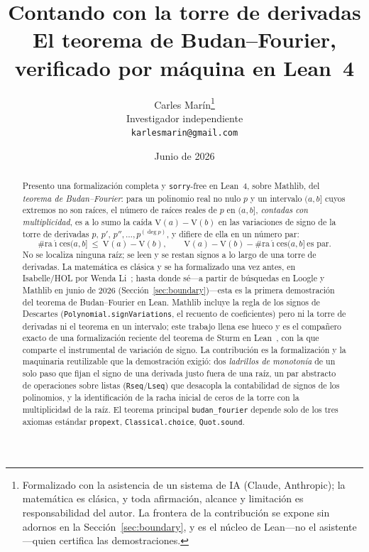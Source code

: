\documentclass[11pt]{article}
\title{\bf Contando con la torre de derivadas\\[4pt]
  \large\normalfont El teorema de Budan--Fourier, verificado por m\'aquina en Lean~4}
\author{Carles Mar\'in\thanks{Formalizado con la asistencia de un sistema de IA (Claude,
Anthropic); la matem\'atica es cl\'asica, y toda afirmaci\'on, alcance y limitaci\'on es
responsabilidad del autor. La frontera de la contribuci\'on se expone sin adornos en la
Secci\'on~\ref{sec:boundary}, y es el n\'ucleo de Lean---no el asistente---quien certifica las
demostraciones.}\\[3pt]
  \normalsize Investigador independiente\\
  \normalsize \texttt{karlesmarin@gmail.com}}
\date{Junio de 2026}
\newcommand{\lean}[1]{\texttt{#1}}
\newcommand{\V}{\mathrm{V}}
\begin{document}
\maketitle

\begin{abstract}
Presento una formalizaci\'on completa y \lean{sorry}-free en Lean~4, sobre Mathlib, del
\emph{teorema de Budan--Fourier}: para un polinomio real no nulo $p$ y un intervalo $(a,b]$ cuyos
extremos no son ra\'ices, el n\'umero de ra\'ices reales de $p$ en $(a,b]$, \emph{contadas con
multiplicidad}, es a lo sumo la ca\'ida $\V(a)-\V(b)$ en las variaciones de signo de la torre de
derivadas $p,\,p',\,p'',\dots,p^{(\deg p)}$, y difiere de ella en un n\'umero par:
\[
  \#\mathrm{ra\acute{\imath}ces}(a,b]\ \le\ \V(a)-\V(b),\qquad
  \V(a)-\V(b)-\#\mathrm{ra\acute{\imath}ces}(a,b]\ \text{es par.}
\]
No se localiza ninguna ra\'iz; se leen y se restan signos a lo largo de una torre de derivadas. La
matem\'atica es cl\'asica y se ha formalizado una vez antes, en Isabelle/HOL por Wenda Li~\cite{liBF};
hasta donde s\'e---a partir de b\'usquedas en Loogle y Mathlib en junio de 2026
(Secci\'on~\ref{sec:boundary})---esta es la primera demostraci\'on del teorema de Budan--Fourier en
Lean. Mathlib incluye la regla de los signos de Descartes (\lean{Polynomial.signVariations}, el
recuento de coeficientes) pero ni la torre de derivadas ni el teorema en un intervalo; este trabajo
llena ese hueco y es el compa\~nero exacto de una formalizaci\'on reciente del teorema de Sturm en
Lean~\cite{sturmlean}, con la que comparte el instrumental de variaci\'on de signo. La contribuci\'on
es la formalizaci\'on y la maquinaria reutilizable que la demostraci\'on exigi\'o: dos
\emph{ladrillos de monoton\'ia} de un solo paso que fijan el signo de una derivada justo fuera de una
ra\'iz, un par abstracto de operaciones sobre listas (\lean{Rseq}/\lean{Lseq}) que desacopla la
contabilidad de signos de los polinomios, y la identificaci\'on de la racha inicial de ceros de la
torre con la multiplicidad de la ra\'iz. El teorema principal \lean{budan\_fourier} depende solo de
los tres axiomas est\'andar \lean{propext}, \lean{Classical.choice}, \lean{Quot.sound}.
\end{abstract}
\end{document}
